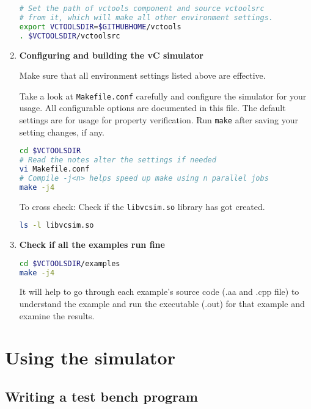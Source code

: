 \documentclass[12pt,a4paper]{article}
\begin{document}
\begin{enumerate}
\begin{lstlisting}[language=bash,style=snippet]
# Set the path of vctools component and source vctoolsrc
# from it, which will make all other environment settings.
export VCTOOLSDIR=$GITHUBHOME/vctools
. $VCTOOLSDIR/vctoolsrc
\end{lstlisting}

\item \textbf{Configuring and building the vC simulator}

Make sure that all environment settings listed above are effective.

Take a look at \texttt{Makefile.conf} carefully and configure the simulator for your usage. All configurable options are documented in this file. The default settings are for usage for property verification. Run \texttt{make} after saving your setting changes, if any.

\begin{lstlisting}[language=bash,style=snippet]
cd $VCTOOLSDIR
# Read the notes alter the settings if needed
vi Makefile.conf
# Compile -j<n> helps speed up make using n parallel jobs
make -j4
\end{lstlisting}

To cross check: Check if the \texttt{libvcsim.so} library has got created.
\begin{lstlisting}[language=bash,style=snippet]
ls -l libvcsim.so
\end{lstlisting}

\item \textbf{Check if all the examples run fine}


\begin{lstlisting}[language=bash,style=snippet]
cd $VCTOOLSDIR/examples
make -j4
\end{lstlisting}

It will help to go through each example's source code (.aa and .cpp file) to understand the example and run the executable (.out) for that example and examine the results.

\end{enumerate}

\clearpage
\section{Using the simulator} \label{Sec:Usage}

\subsection{Writing a test bench program}
\end{document}

